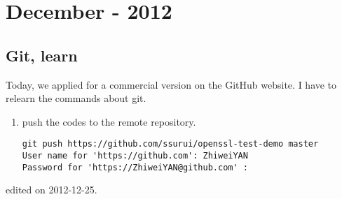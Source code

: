 \chapter{December - 2012} %
\label{ch:dec:2012} %


\section{Git, learn}
Today, we applied for a commercial version on the GitHub website.
I have to relearn the commands about git.
\begin{enumerate}[(1)]
\item push the codes to the remote repository.
\begin{verbatim}
git push https://github.com/ssurui/openssl-test-demo master
User name for 'https://github.com': ZhiweiYAN
Password for 'https://ZhiweiYAN@github.com' : 
\end{verbatim}
\end{enumerate}
\hfill {\tiny  edited on 2012-12-25.}

